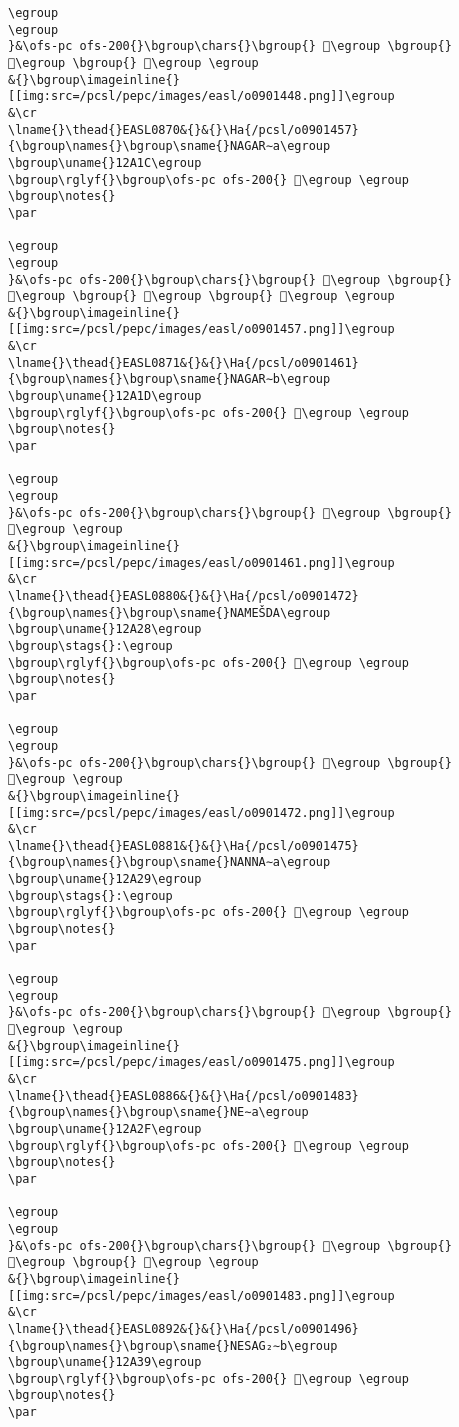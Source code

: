 \begin{verbatim}
\egroup
\egroup
}&\ofs-pc ofs-200{}\bgroup\chars{}\bgroup{} 𒨓\egroup \bgroup{} 𒨔\egroup \bgroup{} 𒨕\egroup \egroup
&{}\bgroup\imageinline{}[[img:src=/pcsl/pepc/images/easl/o0901448.png]]\egroup
&\cr
\lname{}\thead{}EASL0870&{}&{}\Ha{/pcsl/o0901457}{\bgroup\names{}\bgroup\sname{}NAGAR∼a\egroup
\bgroup\uname{}12A1C\egroup
\bgroup\rglyf{}\bgroup\ofs-pc ofs-200{} 𒨜\egroup \egroup
\bgroup\notes{}
\par 

\egroup
\egroup
}&\ofs-pc ofs-200{}\bgroup\chars{}\bgroup{} 𒨙\egroup \bgroup{} 𒨚\egroup \bgroup{} 𒨛\egroup \bgroup{} 𒨜\egroup \egroup
&{}\bgroup\imageinline{}[[img:src=/pcsl/pepc/images/easl/o0901457.png]]\egroup
&\cr
\lname{}\thead{}EASL0871&{}&{}\Ha{/pcsl/o0901461}{\bgroup\names{}\bgroup\sname{}NAGAR∼b\egroup
\bgroup\uname{}12A1D\egroup
\bgroup\rglyf{}\bgroup\ofs-pc ofs-200{} 𒨝\egroup \egroup
\bgroup\notes{}
\par 

\egroup
\egroup
}&\ofs-pc ofs-200{}\bgroup\chars{}\bgroup{} 𒨝\egroup \bgroup{} 𒨞\egroup \egroup
&{}\bgroup\imageinline{}[[img:src=/pcsl/pepc/images/easl/o0901461.png]]\egroup
&\cr
\lname{}\thead{}EASL0880&{}&{}\Ha{/pcsl/o0901472}{\bgroup\names{}\bgroup\sname{}NAMEŠDA\egroup
\bgroup\uname{}12A28\egroup
\bgroup\stags{}:\egroup
\bgroup\rglyf{}\bgroup\ofs-pc ofs-200{} 𒨨\egroup \egroup
\bgroup\notes{}
\par 

\egroup
\egroup
}&\ofs-pc ofs-200{}\bgroup\chars{}\bgroup{} 𒨧\egroup \bgroup{} 𒨨\egroup \egroup
&{}\bgroup\imageinline{}[[img:src=/pcsl/pepc/images/easl/o0901472.png]]\egroup
&\cr
\lname{}\thead{}EASL0881&{}&{}\Ha{/pcsl/o0901475}{\bgroup\names{}\bgroup\sname{}NANNA∼a\egroup
\bgroup\uname{}12A29\egroup
\bgroup\stags{}:\egroup
\bgroup\rglyf{}\bgroup\ofs-pc ofs-200{} 𒨩\egroup \egroup
\bgroup\notes{}
\par 

\egroup
\egroup
}&\ofs-pc ofs-200{}\bgroup\chars{}\bgroup{} 𒨩\egroup \bgroup{} 𒨪\egroup \egroup
&{}\bgroup\imageinline{}[[img:src=/pcsl/pepc/images/easl/o0901475.png]]\egroup
&\cr
\lname{}\thead{}EASL0886&{}&{}\Ha{/pcsl/o0901483}{\bgroup\names{}\bgroup\sname{}NE∼a\egroup
\bgroup\uname{}12A2F\egroup
\bgroup\rglyf{}\bgroup\ofs-pc ofs-200{} 𒨯\egroup \egroup
\bgroup\notes{}
\par 

\egroup
\egroup
}&\ofs-pc ofs-200{}\bgroup\chars{}\bgroup{} 𒨯\egroup \bgroup{} 𒨰\egroup \bgroup{} 𒨱\egroup \egroup
&{}\bgroup\imageinline{}[[img:src=/pcsl/pepc/images/easl/o0901483.png]]\egroup
&\cr
\lname{}\thead{}EASL0892&{}&{}\Ha{/pcsl/o0901496}{\bgroup\names{}\bgroup\sname{}NESAG₂∼b\egroup
\bgroup\uname{}12A39\egroup
\bgroup\rglyf{}\bgroup\ofs-pc ofs-200{} 𒨹\egroup \egroup
\bgroup\notes{}
\par 


\end{verbatim}
